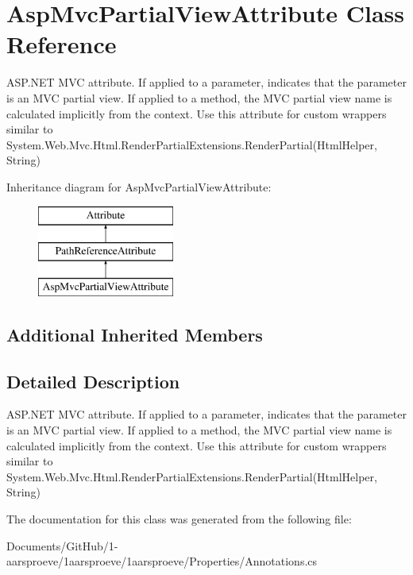 \hypertarget{class_asp_mvc_partial_view_attribute}{}\section{Asp\+Mvc\+Partial\+View\+Attribute Class Reference}
\label{class_asp_mvc_partial_view_attribute}


A\+S\+P.\+N\+E\+T M\+V\+C attribute. If applied to a parameter, indicates that the parameter is an M\+V\+C partial view. If applied to a method, the M\+V\+C partial view name is calculated implicitly from the context. Use this attribute for custom wrappers similar to {\ttfamily System.\+Web.\+Mvc.\+Html.\+Render\+Partial\+Extensions.\+Render\+Partial(\+Html\+Helper, String)}  


Inheritance diagram for Asp\+Mvc\+Partial\+View\+Attribute\+:\begin{figure}[H]
\begin{center}
\leavevmode
\includegraphics[height=3.000000cm]{class_asp_mvc_partial_view_attribute}
\end{center}
\end{figure}
\subsection*{Additional Inherited Members}


\subsection{Detailed Description}
A\+S\+P.\+N\+E\+T M\+V\+C attribute. If applied to a parameter, indicates that the parameter is an M\+V\+C partial view. If applied to a method, the M\+V\+C partial view name is calculated implicitly from the context. Use this attribute for custom wrappers similar to {\ttfamily System.\+Web.\+Mvc.\+Html.\+Render\+Partial\+Extensions.\+Render\+Partial(\+Html\+Helper, String)} 



The documentation for this class was generated from the following file\+:\begin{DoxyCompactItemize}
\item 
Documents/\+Git\+Hub/1-\/aarsproeve/1aarsproeve/1aarsproeve/\+Properties/Annotations.\+cs\end{DoxyCompactItemize}
